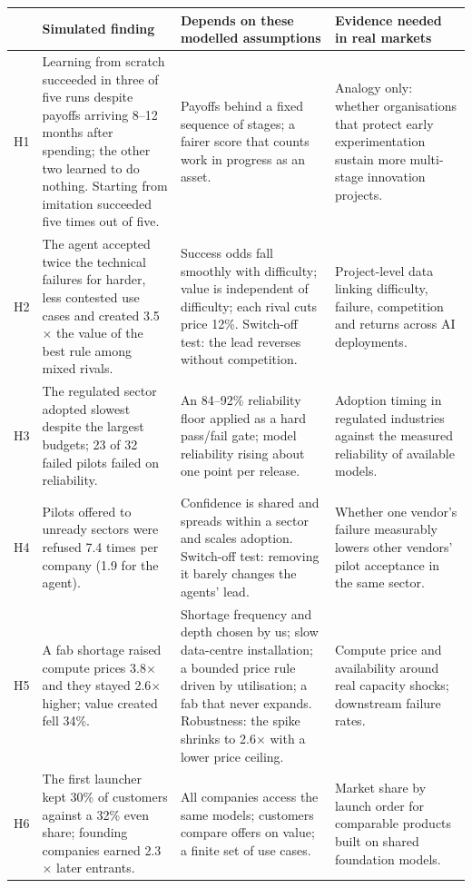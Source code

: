 \documentclass[11pt]{article}
\begin{document}
\begin{table}[!htbp]
\centering
\scriptsize
\renewcommand{\arraystretch}{1.25}
\begin{tabularx}{\linewidth}{>{\raggedright\arraybackslash}p{0.4cm}LLL}
\toprule
 & Simulated finding & Depends on these modelled assumptions & Evidence needed in real markets \\
\midrule
H1 & Learning from scratch succeeded in three of five runs despite payoffs arriving 8--12 months after spending; the other two learned to do nothing. Starting from imitation succeeded five times out of five. & Payoffs behind a fixed sequence of stages; a fairer score that counts work in progress as an asset. & Analogy only: whether organisations that protect early experimentation sustain more multi-stage innovation projects. \\
H2 & The agent accepted twice the technical failures for harder, less contested use cases and created 3.5$\times$ the value of the best rule among mixed rivals. & Success odds fall smoothly with difficulty; value is independent of difficulty; each rival cuts price 12\%. Switch-off test: the lead reverses without competition. & Project-level data linking difficulty, failure, competition and returns across AI deployments. \\
H3 & The regulated sector adopted slowest despite the largest budgets; 23 of 32 failed pilots failed on reliability. & An 84--92\% reliability floor applied as a hard pass/fail gate; model reliability rising about one point per release. & Adoption timing in regulated industries against the measured reliability of available models. \\
H4 & Pilots offered to unready sectors were refused 7.4 times per company (1.9 for the agent). & Confidence is shared and spreads within a sector and scales adoption. Switch-off test: removing it barely changes the agents' lead. & Whether one vendor's failure measurably lowers other vendors' pilot acceptance in the same sector. \\
H5 & A fab shortage raised compute prices 3.8$\times$ and they stayed 2.6$\times$ higher; value created fell 34\%. & Shortage frequency and depth chosen by us; slow data-centre installation; a bounded price rule driven by utilisation; a fab that never expands. Robustness: the spike shrinks to 2.6$\times$ with a lower price ceiling. & Compute price and availability around real capacity shocks; downstream failure rates. \\
H6 & The first launcher kept 30\% of customers against a 32\% even share; founding companies earned 2.3$\times$ later entrants. & All companies access the same models; customers compare offers on value; a finite set of use cases. & Market share by launch order for comparable products built on shared foundation models. \\

\end{tabularx}
\end{table}
\end{document}
